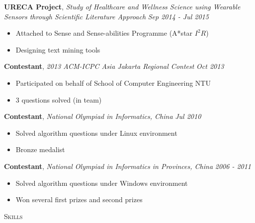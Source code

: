 \documentclass[a4paper, 10pt]{article}
\newenvironment{changemargin}[2]{%
  \begin{list}{}{%
      \setlength{\topsep}{0pt}%
      \setlength{\leftmargin}{#1}%
      \setlength{\rightmargin}{#2}%
      \setlength{\listparindent}{\parindent}%
      \setlength{\itemindent}{\parindent}%
      \setlength{\parsep}{\parskip}%
    }%
  \item[]}{\end{list}
}
\newcommand{\lineover}{
  \begin{changemargin}{-0.05in}{-0.05in}
    \vspace*{-8pt}
    \hrulefill \\
    \vspace*{-2pt}
  \end{changemargin}
}
\newcommand{\header}[1]{
  \begin{changemargin}{-0.5in}{-0.5in}
    \scshape{#1}\\
    \lineover
  \end{changemargin}
}
\newenvironment{body}
{
\vspace*{-16pt}
\begin{changemargin}{-0.25in}{-0.5in}
}	
{
\end{changemargin}
}
\begin{document}
\begin{body}
  \vspace{14pt}

  \textbf{URECA Project}, \emph{Study of Healthcare and Wellness Science using Wearable Sensors through Scientific Literature Approach} \hfill \emph{Sep 2014 - Jul 2015}\\
  \vspace*{-4pt}
  \begin{itemize} \itemsep -0pt  %
  \item Attached to Sense and Sense-abilities Programme (A*star $I^{2}R$)
  \item Designing text mining tools
  \end{itemize}

  \textbf{Contestant}, \emph{2013 ACM-ICPC Asia Jakarta Regional Contest} \hfill \emph{Oct 2013}\\
  \vspace*{-4pt}
  \begin{itemize} \itemsep -0pt  %
  \item Participated on behalf of School of Computer Engineering NTU
  \item 3 questions solved (in team)
  \end{itemize}
  
  \textbf {Contestant}, \emph{National Olympiad in Informatics, China} \hfill \emph{Jul 2010}\\
  \vspace*{-4pt}
  \begin{itemize} \itemsep -0pt
  \item Solved algorithm questions under Linux environment
  \item Bronze medalist
  \end{itemize}

  \textbf {Contestant}, \emph{National Olympiad in Informatics in Provinces, China} \hfill \emph{2006 - 2011}\\
  \vspace*{-4pt}
  \begin{itemize} \itemsep -0pt
  \item Solved algorithm questions under Windows environment
  \item Won several first prizes and second prizes
  \end{itemize}
\end{body}

\smallskip
\medskip
%
%
%
%
\header{Skills}
\end{document}
